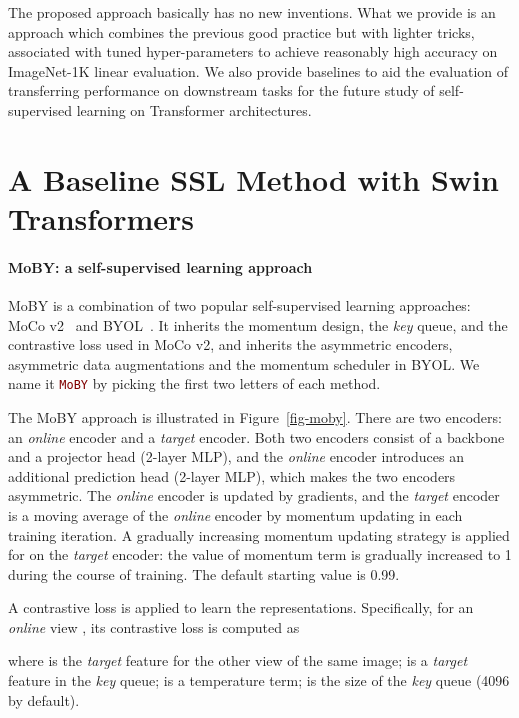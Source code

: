 \documentclass{article}
\begin{document}
The proposed approach basically has no new inventions. What we provide is an approach which combines the previous good practice but with lighter tricks, associated with tuned hyper-parameters to achieve reasonably high accuracy on ImageNet-1K linear evaluation. We also provide baselines to aid the evaluation of transferring performance on downstream tasks for the future study of self-supervised learning on Transformer architectures.

\section{A Baseline SSL Method with Swin Transformers}

\paragraph{MoBY: a self-supervised learning approach} MoBY is a combination of two popular self-supervised learning approaches: MoCo v2~\citep{mocov2} and BYOL~\citep{byol}. It inherits the momentum design, the \emph{key} queue, and the contrastive loss used in MoCo v2, and inherits the asymmetric encoders, asymmetric data augmentations and the momentum scheduler in BYOL. We name it \textcolor{Maroon}{\texttt{MoBY}} by picking the first two letters of each method.

The MoBY approach is illustrated in Figure~\ref{fig-moby}. There are two encoders: an \textit{online} encoder and a \textit{target} encoder. Both two encoders consist of a backbone and a projector head (2-layer MLP), and the \textit{online} encoder introduces an additional prediction head (2-layer MLP), which makes the two encoders asymmetric. The \textit{online} encoder is updated by gradients, and the \textit{target} encoder is a moving average of the \textit{online} encoder by momentum updating in each training iteration. A gradually increasing momentum updating strategy is applied for on the \textit{target} encoder: the value of momentum term is gradually increased to 1 during the course of training. The default starting value is 0.99.

A contrastive loss is applied to learn the representations. Specifically, for an \emph{online} view , its contrastive loss is computed as

where  is the \emph{target} feature for the other view of the same image;  is a \emph{target} feature in the \emph{key} queue;  is a temperature term;  is the size of the \emph{key} queue (4096 by default).
\end{document}
